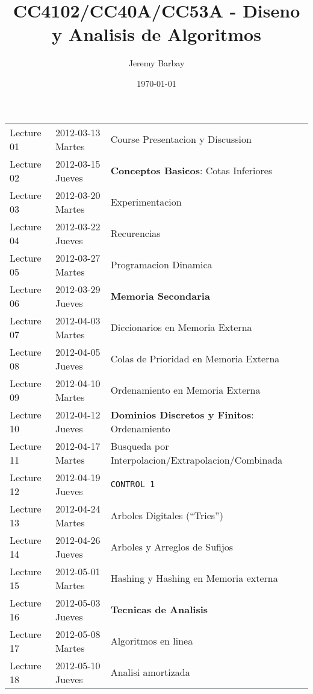 \documentclass{article}
\title{CC4102/CC40A/CC53A - Diseno y Analisis de Algoritmos}
\author{Jeremy Barbay}
\date{\today}
\begin{document}
\label{sec-1}


\begin{center}
\begin{tabular}{lll}
 Lecture 01  &  2012-03-13 Martes  &  Course Presentacion y Discussion                      \\
 Lecture 02  &  2012-03-15 Jueves  &  \textbf{Conceptos Basicos}: Cotas Inferiores          \\
 Lecture 03  &  2012-03-20 Martes  &  Experimentacion                                       \\
 Lecture 04  &  2012-03-22 Jueves  &  Recurencias                                           \\
 Lecture 05  &  2012-03-27 Martes  &  Programacion Dinamica                                 \\
 Lecture 06  &  2012-03-29 Jueves  &  \textbf{Memoria Secondaria}                           \\
 Lecture 07  &  2012-04-03 Martes  &  Diccionarios en Memoria Externa                       \\
 Lecture 08  &  2012-04-05 Jueves  &  Colas de Prioridad en Memoria Externa                 \\
 Lecture 09  &  2012-04-10 Martes  &  Ordenamiento en Memoria Externa                       \\
 Lecture 10  &  2012-04-12 Jueves  &  \textbf{Dominios Discretos y Finitos}: Ordenamiento   \\
 Lecture 11  &  2012-04-17 Martes  &  Busqueda por Interpolacion/Extrapolacion/Combinada    \\
 Lecture 12  &  2012-04-19 Jueves  &  \texttt{CONTROL 1}                                    \\
 Lecture 13  &  2012-04-24 Martes  &  Arboles Digitales (``Tries'')                         \\
 Lecture 14  &  2012-04-26 Jueves  &  Arboles y Arreglos de Sufijos                         \\
 Lecture 15  &  2012-05-01 Martes  &  Hashing y Hashing en Memoria externa                  \\
 Lecture 16  &  2012-05-03 Jueves  &  \textbf{Tecnicas de Analisis}                         \\
 Lecture 17  &  2012-05-08 Martes  &  Algoritmos en linea                                   \\
 Lecture 18  &  2012-05-10 Jueves  &  Analisi amortizada                                    \\

\end{tabular}
\end{center}
\end{document}
